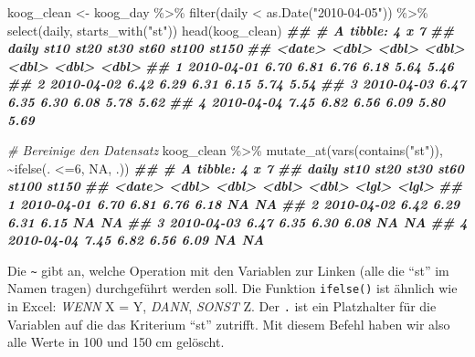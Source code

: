 \documentclass[
]{article}
\newenvironment{Shaded}{\begin{snugshade}}{\end{snugshade}}
\newcommand{\CommentTok}[1]{\textcolor[rgb]{0.56,0.35,0.01}{\textit{#1}}}
\newcommand{\ConstantTok}[1]{\textcolor[rgb]{0.00,0.00,0.00}{#1}}
\newcommand{\DecValTok}[1]{\textcolor[rgb]{0.00,0.00,0.81}{#1}}
\newcommand{\DocumentationTok}[1]{\textcolor[rgb]{0.56,0.35,0.01}{\textbf{\textit{#1}}}}
\newcommand{\FunctionTok}[1]{\textcolor[rgb]{0.00,0.00,0.00}{#1}}
\newcommand{\NormalTok}[1]{#1}
\newcommand{\OtherTok}[1]{\textcolor[rgb]{0.56,0.35,0.01}{#1}}
\newcommand{\SpecialCharTok}[1]{\textcolor[rgb]{0.00,0.00,0.00}{#1}}
\newcommand{\StringTok}[1]{\textcolor[rgb]{0.31,0.60,0.02}{#1}}
\begin{document}
\begin{Shaded}
\begin{Highlighting}[]
\NormalTok{koog\_clean }\OtherTok{\textless{}{-}}\NormalTok{ koog\_day }\SpecialCharTok{\%\textgreater{}\%}
  \FunctionTok{filter}\NormalTok{(daily }\SpecialCharTok{\textless{}} \FunctionTok{as.Date}\NormalTok{(}\StringTok{"2010{-}04{-}05"}\NormalTok{)) }\SpecialCharTok{\%\textgreater{}\%}
  \FunctionTok{select}\NormalTok{(daily, }\FunctionTok{starts\_with}\NormalTok{(}\StringTok{"st"}\NormalTok{))}
\FunctionTok{head}\NormalTok{(koog\_clean)}
\DocumentationTok{\#\# \# A tibble: 4 x 7}
\DocumentationTok{\#\#   daily       st10  st20  st30  st60 st100 st150}
\DocumentationTok{\#\#   \textless{}date\textgreater{}     \textless{}dbl\textgreater{} \textless{}dbl\textgreater{} \textless{}dbl\textgreater{} \textless{}dbl\textgreater{} \textless{}dbl\textgreater{} \textless{}dbl\textgreater{}}
\DocumentationTok{\#\# 1 2010{-}04{-}01  6.70  6.81  6.76  6.18  5.64  5.46}
\DocumentationTok{\#\# 2 2010{-}04{-}02  6.42  6.29  6.31  6.15  5.74  5.54}
\DocumentationTok{\#\# 3 2010{-}04{-}03  6.47  6.35  6.30  6.08  5.78  5.62}
\DocumentationTok{\#\# 4 2010{-}04{-}04  7.45  6.82  6.56  6.09  5.80  5.69}

\CommentTok{\# Bereinige den Datensatz}
\NormalTok{koog\_clean }\SpecialCharTok{\%\textgreater{}\%} 
  \FunctionTok{mutate\_at}\NormalTok{(}\FunctionTok{vars}\NormalTok{(}\FunctionTok{contains}\NormalTok{(}\StringTok{"st"}\NormalTok{)), }\SpecialCharTok{\textasciitilde{}}\FunctionTok{ifelse}\NormalTok{(. }\SpecialCharTok{\textless{}=}\DecValTok{6}\NormalTok{, }\ConstantTok{NA}\NormalTok{, .))}
\DocumentationTok{\#\# \# A tibble: 4 x 7}
\DocumentationTok{\#\#   daily       st10  st20  st30  st60 st100 st150}
\DocumentationTok{\#\#   \textless{}date\textgreater{}     \textless{}dbl\textgreater{} \textless{}dbl\textgreater{} \textless{}dbl\textgreater{} \textless{}dbl\textgreater{} \textless{}lgl\textgreater{} \textless{}lgl\textgreater{}}
\DocumentationTok{\#\# 1 2010{-}04{-}01  6.70  6.81  6.76  6.18 NA    NA   }
\DocumentationTok{\#\# 2 2010{-}04{-}02  6.42  6.29  6.31  6.15 NA    NA   }
\DocumentationTok{\#\# 3 2010{-}04{-}03  6.47  6.35  6.30  6.08 NA    NA   }
\DocumentationTok{\#\# 4 2010{-}04{-}04  7.45  6.82  6.56  6.09 NA    NA}
\end{Highlighting}
\end{Shaded}

Die \texttt{\textasciitilde{}} gibt an, welche Operation mit den Variablen zur Linken (alle die ``st'' im Namen tragen) durchgeführt werden soll. Die Funktion \texttt{ifelse()} ist ähnlich wie in Excel: \emph{WENN} X = Y, \emph{DANN}, \emph{SONST} Z. Der \texttt{.} ist ein Platzhalter für die Variablen auf die das Kriterium ``st'' zutrifft. Mit diesem Befehl haben wir also alle Werte in 100 und 150 cm gelöscht.
\end{document}
